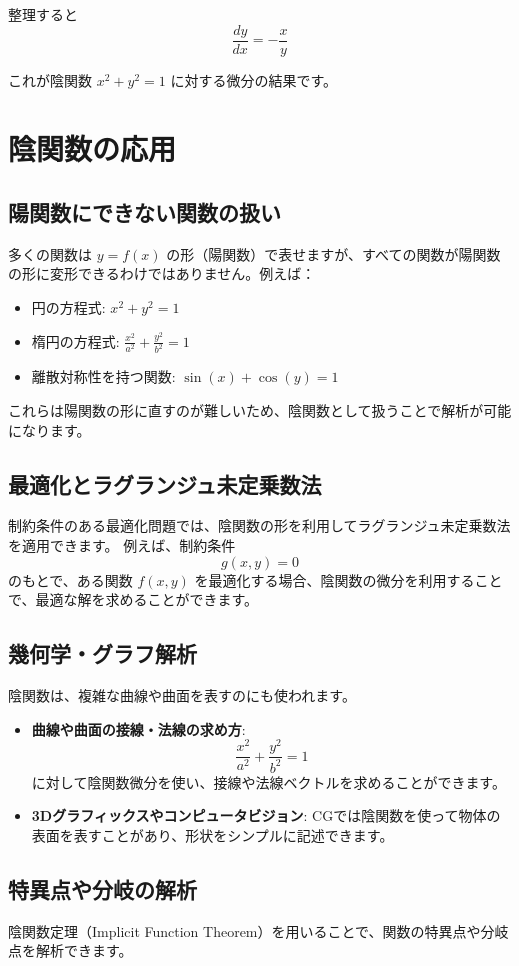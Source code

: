 \documentclass{article}
\begin{document}
整理すると
\[
\frac{dy}{dx} = -\frac{x}{y}
\]

これが陰関数 $x^2 + y^2 = 1$ に対する微分の結果です。

\section{陰関数の応用}

\subsection{陽関数にできない関数の扱い}

多くの関数は $y = f(x)$ の形（陽関数）で表せますが、すべての関数が陽関数の形に変形できるわけではありません。例えば：
\begin{itemize}
    \item 円の方程式: $x^2 + y^2 = 1$
    \item 楕円の方程式: $\frac{x^2}{a^2} + \frac{y^2}{b^2} = 1$
    \item 離散対称性を持つ関数: $\sin(x) + \cos(y) = 1$
\end{itemize}
これらは陽関数の形に直すのが難しいため、陰関数として扱うことで解析が可能になります。

\subsection{最適化とラグランジュ未定乗数法}
制約条件のある最適化問題では、陰関数の形を利用してラグランジュ未定乗数法を適用できます。
例えば、制約条件
\[
g(x, y) = 0
\]
のもとで、ある関数 $f(x, y)$ を最適化する場合、陰関数の微分を利用することで、最適な解を求めることができます。

\subsection{幾何学・グラフ解析}
陰関数は、複雑な曲線や曲面を表すのにも使われます。
\begin{itemize}
    \item \textbf{曲線や曲面の接線・法線の求め方}:
        \[
        \frac{x^2}{a^2} + \frac{y^2}{b^2} = 1
        \]
        に対して陰関数微分を使い、接線や法線ベクトルを求めることができます。
    \item \textbf{3Dグラフィックスやコンピュータビジョン}: CGでは陰関数を使って物体の表面を表すことがあり、形状をシンプルに記述できます。
\end{itemize}

\subsection{特異点や分岐の解析}
陰関数定理（Implicit Function Theorem）を用いることで、関数の特異点や分岐点を解析できます。
\end{document}
